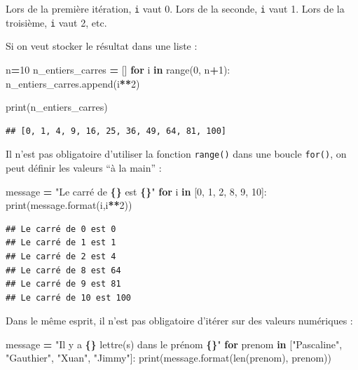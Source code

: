 \documentclass[
  12pt,
]{book}
\newenvironment{Shaded}{\begin{snugshade}}{\end{snugshade}}
\newcommand{\BuiltInTok}[1]{#1}
\newcommand{\ControlFlowTok}[1]{\textcolor[rgb]{0.13,0.29,0.53}{\textbf{#1}}}
\newcommand{\DecValTok}[1]{\textcolor[rgb]{0.00,0.00,0.81}{#1}}
\newcommand{\KeywordTok}[1]{\textcolor[rgb]{0.13,0.29,0.53}{\textbf{#1}}}
\newcommand{\NormalTok}[1]{#1}
\newcommand{\OperatorTok}[1]{\textcolor[rgb]{0.81,0.36,0.00}{\textbf{#1}}}
\newcommand{\SpecialCharTok}[1]{\textcolor[rgb]{0.81,0.36,0.00}{\textbf{#1}}}
\newcommand{\StringTok}[1]{\textcolor[rgb]{0.31,0.60,0.02}{#1}}
\numberwithin{equation}{section}
\numberwithin{countremarque}{section}
\begin{document}
Lors de la première itération, \texttt{i} vaut 0. Lors de la seconde, \texttt{i} vaut 1. Lors de la troisième, \texttt{i} vaut 2, etc.

Si on veut stocker le résultat dans une liste :

\begin{Shaded}
\begin{Highlighting}[]
\NormalTok{n}\OperatorTok{=}\DecValTok{10}
\NormalTok{n\_entiers\_carres }\OperatorTok{=}\NormalTok{ []}
\ControlFlowTok{for}\NormalTok{ i }\KeywordTok{in} \BuiltInTok{range}\NormalTok{(}\DecValTok{0}\NormalTok{, n}\OperatorTok{+}\DecValTok{1}\NormalTok{):}
\NormalTok{  n\_entiers\_carres.append(i}\OperatorTok{**}\DecValTok{2}\NormalTok{)}
  
\BuiltInTok{print}\NormalTok{(n\_entiers\_carres)}
\end{Highlighting}
\end{Shaded}

\begin{lstlisting}
## [0, 1, 4, 9, 16, 25, 36, 49, 64, 81, 100]
\end{lstlisting}

Il n'est pas obligatoire d'utiliser la fonction \texttt{range()} dans une boucle \texttt{for()}, on peut définir les valeurs ``à la main'' :

\begin{Shaded}
\begin{Highlighting}[]
\NormalTok{message }\OperatorTok{=} \StringTok{"Le carré de }\SpecialCharTok{\{\}}\StringTok{ est }\SpecialCharTok{\{\}}\StringTok{"}
\ControlFlowTok{for}\NormalTok{ i }\KeywordTok{in}\NormalTok{ [}\DecValTok{0}\NormalTok{, }\DecValTok{1}\NormalTok{, }\DecValTok{2}\NormalTok{, }\DecValTok{8}\NormalTok{, }\DecValTok{9}\NormalTok{, }\DecValTok{10}\NormalTok{]:}
  \BuiltInTok{print}\NormalTok{(message.}\BuiltInTok{format}\NormalTok{(i,i}\OperatorTok{**}\DecValTok{2}\NormalTok{))}
\end{Highlighting}
\end{Shaded}

\begin{lstlisting}
## Le carré de 0 est 0
## Le carré de 1 est 1
## Le carré de 2 est 4
## Le carré de 8 est 64
## Le carré de 9 est 81
## Le carré de 10 est 100
\end{lstlisting}

Dans le même esprit, il n'est pas obligatoire d'itérer sur des valeurs numériques :

\begin{Shaded}
\begin{Highlighting}[]
\NormalTok{message }\OperatorTok{=} \StringTok{"Il y a }\SpecialCharTok{\{\}}\StringTok{ lettre(s) dans le prénom }\SpecialCharTok{\{\}}\StringTok{"}
\ControlFlowTok{for}\NormalTok{ prenom }\KeywordTok{in}\NormalTok{ [}\StringTok{"Pascaline"}\NormalTok{, }\StringTok{"Gauthier"}\NormalTok{, }\StringTok{"Xuan"}\NormalTok{, }\StringTok{"Jimmy"}\NormalTok{]:}
  \BuiltInTok{print}\NormalTok{(message.}\BuiltInTok{format}\NormalTok{(}\BuiltInTok{len}\NormalTok{(prenom), prenom))}
\end{Highlighting}
\end{Shaded}
\end{document}
